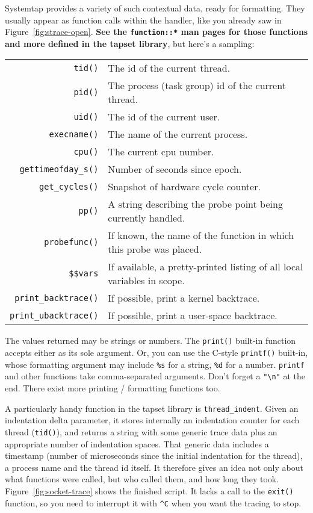 \documentclass{article}
\begin{document}
Systemtap provides a variety of such contextual data, ready for
formatting.  They usually appear as function calls within the handler,
like you already saw in Figure~\ref{fig:strace-open}.  {\bf See the
\verb+function::*+ man pages for those functions and more defined in the
tapset library}, but here's a sampling:

\begin{tabular}{rl}
\verb+tid()+ & The id of the current thread. \\
\verb+pid()+ & The process (task group) id of the current thread. \\
\verb+uid()+ & The id of the current user. \\
\verb+execname()+ & The name of the current process. \\
\verb+cpu()+ & The current cpu number. \\
\verb+gettimeofday_s()+ & Number of seconds since epoch. \\
\verb+get_cycles()+ & Snapshot of hardware cycle counter. \\
\verb+pp()+ & A string describing the probe point being currently handled. \\
\verb+probefunc()+ & If known, the name of the function in which
                     this probe was placed. \\
\verb+$$vars+ & If available, a pretty-printed listing of all local
                variables in scope. \\
\verb+print_backtrace()+ & If possible, print a kernel backtrace. \\
\verb+print_ubacktrace()+ & If possible, print a user-space backtrace. \\
\end{tabular}

The values returned may be strings or numbers.  The \verb+print()+
built-in function accepts either as its sole argument.  Or, you can
use the C-style \verb+printf()+ built-in, whose formatting argument
may include \verb+%s+ for a string, \verb+%d+ for a number.
\verb+printf+ and other functions take comma-separated arguments.
Don't forget a \verb+"\n"+ at the end.  There exist more printing /
formatting functions too.

A particularly handy function in the tapset library is
\verb+thread_indent+.  Given an indentation delta parameter, it stores
internally an indentation counter for each thread (\verb+tid()+), and
returns a string with some generic trace data plus an appropriate
number of indentation spaces.  That generic data includes a timestamp
(number of microseconds since the initial indentation for the thread), a
process name and the thread id itself.  It therefore gives an idea not
only about what functions were called, but who called them, and how
long they took.  Figure~\ref{fig:socket-trace} shows the finished
script.  It lacks a call to the \verb+exit()+ function, so you need to
interrupt it with \verb+^C+ when you want the tracing to stop.
\end{document}
